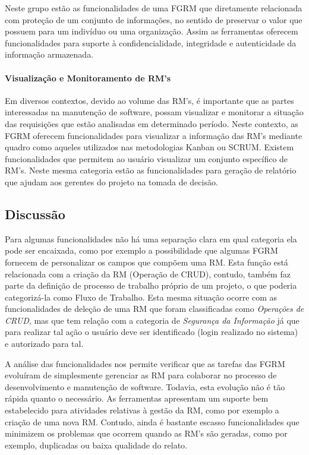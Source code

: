 Neste grupo estão as funcionalidades de uma FGRM que diretamente relacionada com
proteção de um conjunto de informações, no sentido de preservar o valor que
possuem para um indivíduo ou uma organização. Assim as ferramentas oferecem
funcionalidades para suporte à confidencialidade, integridade e autenticidade da
informação armazenada.

\paragraph{Visualização e Monitoramento de RM's}
\label{par:visualização_de_rm_s}

Em diversos contextos, devido ao volume das RM's, é importante que as partes
interessadas na manutenção de software, possam visualizar e monitorar a situação
das requisições que estão analisadas em determinado período. Neste contexto, as
FGRM oferecem funcionalidades para visualizar a informação das RM's mediante
quadro como aqueles utilizados nas metodologias Kanban ou SCRUM. Existem
funcionalidades que permitem ao usuário visualizar um conjunto específico de
RM's. Neste mesma categoria estão as funcionalidades para geração de relatório
que ajudam aos gerentes do projeto na tomada de decisão.

\subsection{Discussão}
\label{sec:discussao}

Para algumas funcionalidades não há uma separação clara em qual categoria ela
pode ser encaixada, como por exemplo a possibilidade que algumas FGRM fornecem
de personalizar os campos que compõem uma RM. Esta função está relacionada com a
criação da RM (Operação de CRUD), contudo, também faz parte da definição de
processo de trabalho próprio de um projeto, o que poderia categorizá-la como
Fluxo de Trabalho. Esta mesma situação ocorre com as funcionalidades de deleção
de uma RM que foram classificadas como \textit{Operações de CRUD}, mas que tem
relação com a categoria de \textit{Segurança da Informação} já que para realizar
tal ação o usuário deve ser identificado (login realizado no sistema) e
autorizado para tal.

A análise das funcionalidades nos permite verificar que as tarefas das FGRM
evoluíram de simplesmente gerenciar as RM para colaborar no processo de
desenvolvimento e manutenção de software. Todavia, esta evolução não é tão
rápida quanto o necessário. As ferramentas apresentam um suporte bem
estabelecido para atividades relativas à gestão da RM, como por exemplo a
criação de uma nova RM. Contudo, ainda é bastante escasso funcionalidades que
minimizem os problemas que ocorrem quando as RM's são geradas, como por exemplo,
duplicadas ou baixa qualidade do relato.

